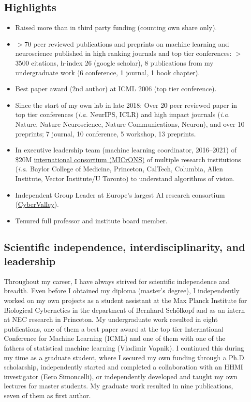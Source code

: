 \documentclass[COG,11pt]{ercgrant}
\begin{document}
\subsection{Highlights}
\begin{itemize}
    \item Raised more than  in third party funding (counting own share only).
    \item $>70$ peer reviewed publications and preprints on machine learning and neuroscience published in high ranking journals and top tier conferences: $>$3500 citations, h-index 26 (google scholar), 8 publications from my undergraduate work (6 conference, 1 journal, 1 book chapter).
    \item Best paper award (2nd author) at ICML 2006 (top tier conference).
    \item Since the start of my own lab in late 2018: Over 20 peer reviewed paper in top tier conferences (\textit{i.a.} NeurIPS, ICLR) and high impact journals (\textit{i.a.} Nature, Nature Neuroscience, Nature Communications, Neuron), and over 10 preprints; 7 journal, 10  conference, 5 workshop, 13 preprints.
    \item In executive leadership team (machine learning coordinator, 2016--2021) of \$20M \href{https://www.ninai.org/}{international consortium (MICrONS)} of multiple research institutions (\textit{i.a.} Baylor College of Medicine, Princeton, CalTech, Columbia, Allen Institute, Vector Institute/U Toronto) to understand algorithms of vision.
    \item Independent Group Leader at Europe's largest AI research consortium (\href{https://cyber-valley.de/}{CyberValley}).
    \item Tenured full professor and institute board member. 
\end{itemize}

\subsection{Scientific independence, interdisciplinarity, and leadership}
Throughout my career, I have always strived for scientific independence and breadth. Even before I obtained my diploma (master's degree), I independently worked on my own  projects as a student assistant at the Max Planck Institute for Biological Cybernetics in the department of Bernhard Schölkopf and as an intern at NEC research in Princeton. My undergraduate work resulted in eight publications, one of them a best paper award at the top tier International Conference for Machine Learning (ICML) and one of them with one of the fathers of statistical machine learning (Vladimir Vapnik). I continued this during my time as a graduate student, where I secured my own funding through a Ph.D. scholarship, independently started and completed a collaboration with an HHMI investigator (Eero Simoncelli), or independently developed and taught my own lectures for master students. My graduate work resulted in nine publications, seven of them as first author. 
\end{document}
